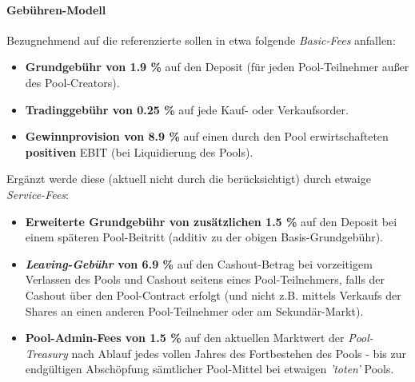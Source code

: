 
\paragraph{Gebühren-Modell}
\label{fees-model}
\textbf{ }
\vspace{0.2cm}

\begin{Assumption}[Gebühren]
\label{fees}
\vspace{0.2cm}

Bezugnehmend auf die referenzierte  sollen in etwa folgende \textit{Basic-Fees} anfallen:

\begin{itemize}
	\item \textbf{Grundgebühr von 1.9 \%} auf den Deposit (für jeden Pool-Teilnehmer außer des Pool-Creators).
	\item \textbf{Tradinggebühr von 0.25 \%} auf jede Kauf- oder Verkaufsorder.
	\item \textbf{Gewinnprovision von 8.9 \%} auf einen durch den Pool erwirtschafteten \textbf{positiven} EBIT (bei Liquidierung des Pools).
\end{itemize}

\vspace{0.2cm}

Ergänzt werde diese (aktuell nicht durch die  berücksichtigt) durch etwaige \textit{Service-Fees}: 

\begin{itemize}
	\item \textbf{Erweiterte Grundgebühr von zusätzlichen 1.5 \%} auf den Deposit bei einem späteren Pool-Beitritt (additiv zu der obigen Basis-Grundgebühr).
	\item \textbf{\textit{Leaving-Gebühr} von 6.9 \%} auf den Cashout-Betrag bei vorzeitigem Verlassen des Pools und Cashout seitens eines Pool-Teilnehmers, falls der Cashout über den Pool-Contract erfolgt (und nicht z.B. mittels Verkaufs der Shares an einen anderen Pool-Teilnehmer oder am Sekundär-Markt).
	\item \textbf{Pool-Admin-Fees von 1.5 \%} auf den aktuellen Marktwert der \textit{Pool-Treasury} nach Ablauf jedes vollen Jahres des Fortbestehen des Pools - bis zur endgültigen Abschöpfung sämtlicher Pool-Mittel bei etwaigen \textit{'toten'} Pools.
\end{itemize}

\vspace{0.2cm}


\end{Assumption}
